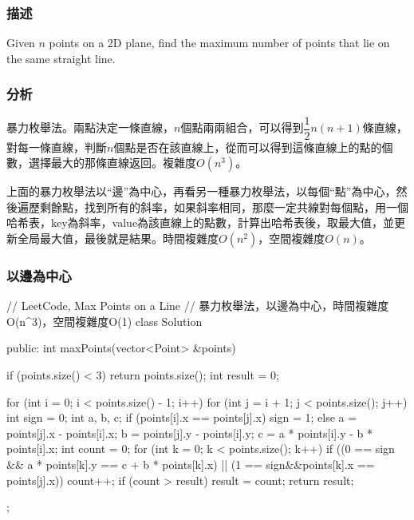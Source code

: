 \subsubsection{描述}
Given $n$ points on a 2D plane, find the maximum number of points that lie on the same straight line.


\subsubsection{分析}
暴力枚舉法。兩點決定一條直線，$n$個點兩兩組合，可以得到$\dfrac{1}{2}n(n+1)$條直線，對每一條直線，判斷$n$個點是否在該直線上，從而可以得到這條直線上的點的個數，選擇最大的那條直線返回。複雜度$O(n^3)$。

上面的暴力枚舉法以“邊”為中心，再看另一種暴力枚舉法，以每個“點”為中心，然後遍歷剩餘點，找到所有的斜率，如果斜率相同，那麼一定共線對每個點，用一個哈希表，key為斜率，value為該直線上的點數，計算出哈希表後，取最大值，並更新全局最大值，最後就是結果。時間複雜度$O(n^2)$，空間複雜度$O(n)$。


\subsubsection{以邊為中心}
\begin{Code}
// LeetCode, Max Points on a Line
// 暴力枚舉法，以邊為中心，時間複雜度O(n^3)，空間複雜度O(1)
class Solution {
public:
    int maxPoints(vector<Point> &points) {
        if (points.size() < 3) return points.size();
        int result = 0;

        for (int i = 0; i < points.size() - 1; i++) {
            for (int j = i + 1; j < points.size(); j++) {
                int sign = 0;
                int a, b, c;
                if (points[i].x == points[j].x) sign = 1;
                else {
                    a = points[j].x - points[i].x;
                    b = points[j].y - points[i].y;
                    c = a * points[i].y - b * points[i].x;
                }
                int count = 0;
                for (int k = 0; k < points.size(); k++) {
                    if ((0 == sign && a * points[k].y == c +  b * points[k].x) ||
                        (1 == sign&&points[k].x == points[j].x))
                        count++;
                }
                if (count > result) result = count;
            }
        }
        return result;
    }
};
\end{Code}


